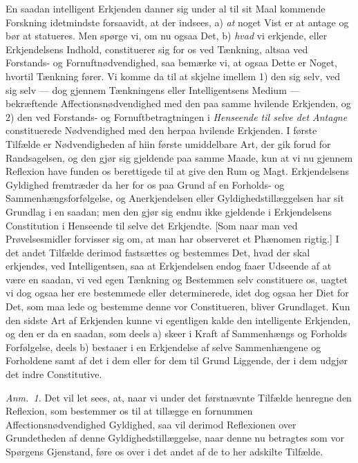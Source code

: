 \documentclass[12pt,a4paper]{book}
\newcommand{\apage}[1]{\marginnote{\footnotesize\textit{[#1]}}}
\begin{document}
\apage{15} En saadan intelligent Erkjenden danner sig under al til sit Maal kommende
Forskning idetmindste forsaavidt, at der indsees, a) \emph{at} noget Vist er at
antage og bør at statueres. Men spørge vi, om nu ogsaa Det, b) \emph{hvad} vi
erkjende, eller Erkjendelsens Indhold, constituerer sig for os ved Tænkning,
altsaa ved Forstands- og Fornuftnødvendighed, saa bemærke vi, at ogsaa Dette er
Noget, hvortil Tænkning fører. Vi komme da til at skjelne imellem 1) den sig
selv, ved sig selv --- dog gjennem Tænkningens eller Intelligentsens Medium ---
bekræftende Affectionsnødvendighed med den paa samme hvilende Erkjenden, og 2)
den ved Forstands- og Fornuftbetragtningen i \emph{Henseende til selve det
Antagne} constituerede Nødvendighed med den herpaa hvilende Erkjenden. I første
Tilfælde er Nødvendigheden af hiin første umiddelbare Art, der gik forud for
Randsagelsen, og den gjør sig gjeldende paa samme Maade, kun at vi nu gjennem
Reflexion have funden os berettigede til at give den Rum og Magt. Erkjendelsens
Gyldighed fremtræder da her for os paa Grund af en Forholds- og
Sammenhængsforfølgelse, og Anerkjendelsen eller Gyldighedstillæggelsen har sit
Grundlag i en saadan; men den gjør sig endnu ikke gjeldende i Erkjendelsens
Constitution i Henseende til selve det Erkjendte. [Som naar man ved
Prøvelsesmidler forvisser sig om, at man har observeret et Phænomen rigtig.] I
det andet Tilfælde derimod fastsættes og bestemmes Det, hvad der skal erkjendes,
ved Intelligentsen, saa at Erkjendelsen endog faaer Udseende af at være en
saadan, vi ved egen Tænkning og Bestemmen selv constituere os, uagtet vi dog
ogsaa her ere bestemmede eller determinerede, idet dog ogsaa her
Diet for Det, som maa lede og bestemme denne vor Constitueren, bliver
Grundlaget. Kun den sidste Art af Erkjenden kunne vi egentligen kalde den
intelligente Erkjenden, og den er da en saadan, som deels a) skeer i Kraft af
Sammenhængs og Forholds Forfølgelse, deels b) bestaaer i en Erkjendelse \apage{16}  af selve
Sammenhængene og Forholdene samt af det i dem eller for dem til Grund Liggende,
der i dem udgjør det indre Constitutive.

{\small\emph{Anm.~1.} Det vil let sees, at, naar vi under det førstnævnte
Tilfælde henregne den Reflexion, som bestemmer os til at tillægge en fornummen
Affectionsnødvendighed Gyldighed, saa vil derimod Reflexionen over Grundetheden
af denne Gyldighedstillæggelse, naar denne nu betragtes som vor Spørgens
Gjenstand, føre os over i det andet af de to her adskilte Tilfælde.\par}
\end{document}
